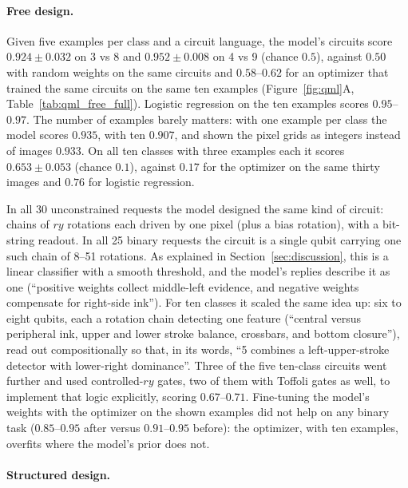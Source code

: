 \paragraph{Free design.}
Given five examples per class and a circuit language, the model's circuits score $0.924 \pm 0.032$ on 3 vs 8 and $0.952 \pm 0.008$ on 4 vs 9 (chance $0.5$), against $0.50$ with random weights on the same circuits and $0.58$--$0.62$ for an optimizer that trained the same circuits on the same ten examples (Figure~\ref{fig:qml}A, Table~\ref{tab:qml_free_full}). Logistic regression on the ten examples scores $0.95$--$0.97$. The number of examples barely matters: with one example per class the model scores $0.935$, with ten $0.907$, and shown the pixel grids as integers instead of images $0.933$. On all ten classes with three examples each it scores $0.653 \pm 0.053$ (chance $0.1$), against $0.17$ for the optimizer on the same thirty images and $0.76$ for logistic regression.

In all 30 unconstrained requests the model designed the same kind of circuit: chains of $ry$ rotations each driven by one pixel (plus a bias rotation), with a bit-string readout. In all 25 binary requests the circuit is a single qubit carrying one such chain of 8--51 rotations. As explained in Section~\ref{sec:discussion}, this is a linear classifier with a smooth threshold, and the model's replies describe it as one (``positive weights collect middle-left evidence, and negative weights compensate for right-side ink''). For ten classes it scaled the same idea up: six to eight qubits, each a rotation chain detecting one feature (``central versus peripheral ink, upper and lower stroke balance, crossbars, and bottom closure''), read out compositionally so that, in its words, ``5 combines a left-upper-stroke detector with lower-right dominance''. Three of the five ten-class circuits went further and used controlled-$ry$ gates, two of them with Toffoli gates as well, to implement that logic explicitly, scoring $0.67$--$0.71$. Fine-tuning the model's weights with the optimizer on the shown examples did not help on any binary task ($0.85$--$0.95$ after versus $0.91$--$0.95$ before): the optimizer, with ten examples, overfits where the model's prior does not.

\paragraph{Structured design.}


